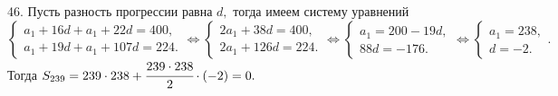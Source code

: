 46. Пусть разность прогрессии равна $d,$ тогда имеем систему уравнений\\ $\begin{cases} a_1+16d+a_1+22d=400,\\a_1+19d+a_1+107d=224.\end{cases}\Leftrightarrow
\begin{cases} 2a_1+38d=400,\\2a_1+126d=224.\end{cases}\Leftrightarrow
\begin{cases} a_1=200-19d,\\88d=-176.\end{cases}\Leftrightarrow
\begin{cases} a_1=238,\\ d=-2.\end{cases}.$ Тогда $S_{239}=239\cdot238+\cfrac{239\cdot238}{2}\cdot(-2)=0.$\\
